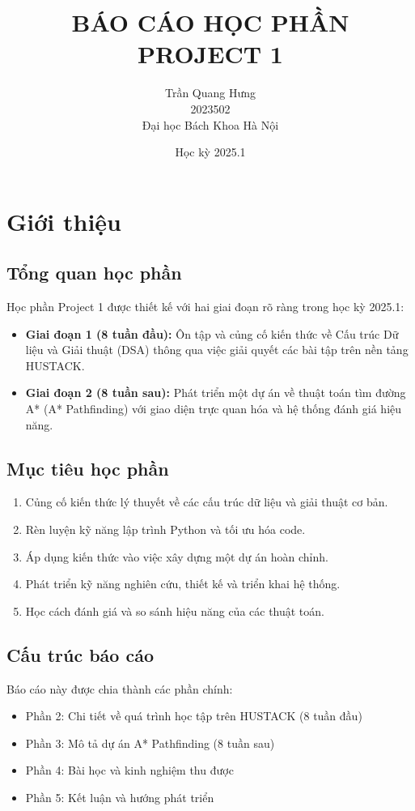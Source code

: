 \documentclass[12pt,a4paper]{article}
\title{\textbf{BÁO CÁO HỌC PHẦN PROJECT 1}}
\author{Trần Quang Hưng\\
2023502\\
Đại học Bách Khoa Hà Nội}
\date{Học kỳ 2025.1}
\begin{document}
\maketitle
\thispagestyle{empty}

\newpage
\tableofcontents
\newpage

\section{Giới thiệu}

\subsection{Tổng quan học phần}
Học phần Project 1 được thiết kế với hai giai đoạn rõ ràng trong học kỳ 2025.1:

\begin{itemize}
    \item \textbf{Giai đoạn 1 (8 tuần đầu):} Ôn tập và củng cố kiến thức về Cấu trúc Dữ liệu và Giải thuật (DSA) thông qua việc giải quyết các bài tập trên nền tảng HUSTACK.
    \item \textbf{Giai đoạn 2 (8 tuần sau):} Phát triển một dự án về thuật toán tìm đường A* (A* Pathfinding) với giao diện trực quan hóa và hệ thống đánh giá hiệu năng.
\end{itemize}

\subsection{Mục tiêu học phần}
\begin{enumerate}
    \item Củng cố kiến thức lý thuyết về các cấu trúc dữ liệu và giải thuật cơ bản.
    \item Rèn luyện kỹ năng lập trình Python và tối ưu hóa code.
    \item Áp dụng kiến thức vào việc xây dựng một dự án hoàn chỉnh.
    \item Phát triển kỹ năng nghiên cứu, thiết kế và triển khai hệ thống.
    \item Học cách đánh giá và so sánh hiệu năng của các thuật toán.
\end{enumerate}

\subsection{Cấu trúc báo cáo}
Báo cáo này được chia thành các phần chính:
\begin{itemize}
    \item Phần 2: Chi tiết về quá trình học tập trên HUSTACK (8 tuần đầu)
    \item Phần 3: Mô tả dự án A* Pathfinding (8 tuần sau)
    \item Phần 4: Bài học và kinh nghiệm thu được
    \item Phần 5: Kết luận và hướng phát triển
\end{itemize}
\end{document}
